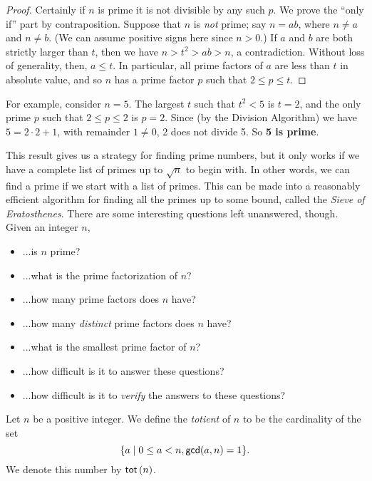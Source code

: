 \begin{proof}
Certainly if \(n\) is prime it is not divisible by any such \(p\).
We prove the ``only if'' part by contraposition.
Suppose that \(n\) is \emph{not} prime; say \(n = ab\), where \(n \neq a\) and \(n \neq b\).
(We can assume positive signs here since \(n > 0\).)
If \(a\) and \(b\) are both strictly larger than \(t\), then we have \(n > t^2 > ab > n\), a contradiction.
Without loss of generality, then, \(a \leq t\).
In particular, all prime factors of \(a\) are less than \(t\) in absolute value, and so \(n\) has a prime factor \(p\) such that \(2 \leq p \leq t\).
\end{proof}

For example, consider \(n = 5\).
The largest \(t\) such that \(t^2 < 5\) is \(t = 2\), and the only prime \(p\) such that \(2 \leq p \leq 2\) is \(p = 2\).
Since (by the Division Algorithm) we have \(5 = 2 \cdot 2 + 1\), with remainder \(1 \neq 0\), 2 does not divide 5.
So \textbf{5 is prime}.

This result gives us a strategy for finding prime numbers, but it only works if we have a complete list of primes up to \(\sqrt{n}\) to begin with.
In other words, we can find a prime if we start with a list of primes.
This can be made into a reasonably efficient algorithm for finding all the primes up to some bound, called the \emph{Sieve of Eratosthenes}.
There are some interesting questions left unanswered, though.
Given an integer \(n\),
\begin{itemize}
\item ...is \(n\) prime?
\item ...what is the prime factorization of \(n\)?
\item ...how many prime factors does \(n\) have?
\item ...how many \emph{distinct} prime factors does \(n\) have?
\item ...what is the smallest prime factor of \(n\)?
\item ...how difficult is it to answer these questions?
\item ...how difficult is it to \emph{verify} the answers to these questions?
\end{itemize}



\Exercises%

\begin{dfn}
Let $n$ be a positive integer.
We define the \emph{totient} of \(n\) to be the cardinality of the set \[ \{ a \mid 0 \leq a < n, \mathsf{gcd}(a, n) = 1 \}. \]
We denote this number by \(\mathsf{tot}\left(n\right)\).
\end{dfn}
